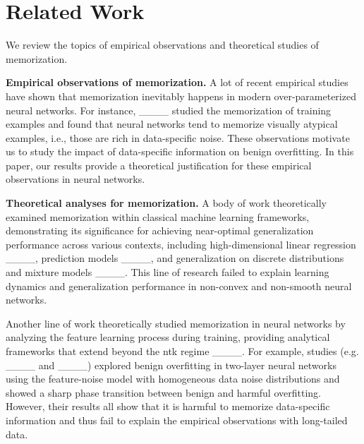 \section{Related Work}
We review the topics of empirical observations and theoretical studies of memorization.

\textbf{Empirical observations of memorization.}
A lot of recent empirical studies have shown that memorization inevitably happens in modern over-parameterized neural networks.
For instance, ____ studied the memorization of training examples and found that neural networks tend to memorize visually atypical examples, i.e., those are rich in data-specific noise. 
These observations motivate us to study the impact of data-specific information on benign overfitting.
In this paper, our results provide a theoretical justification for these empirical observations in neural networks. 

\textbf{Theoretical analyses for memorization.}
A body of work theoretically examined memorization within classical machine learning frameworks, demonstrating its significance for achieving near-optimal generalization performance across various contexts, including high-dimensional linear regression ____, prediction models ____, and generalization on discrete distributions and mixture models ____.
This line of research failed to explain learning dynamics and generalization performance in non-convex and non-smooth neural networks.

Another line of work theoretically studied memorization in neural networks by analyzing the feature learning process during training, providing analytical frameworks that extend beyond the \ac{ntk} regime ____.
For example, studies (e.g. ____ and ____) explored benign overfitting in two-layer neural networks using the feature-noise model with homogeneous data noise distributions and showed a sharp phase transition between benign and harmful overfitting.
However, their results all show that it is harmful to memorize data-specific information and thus fail to explain the empirical observations with long-tailed data.